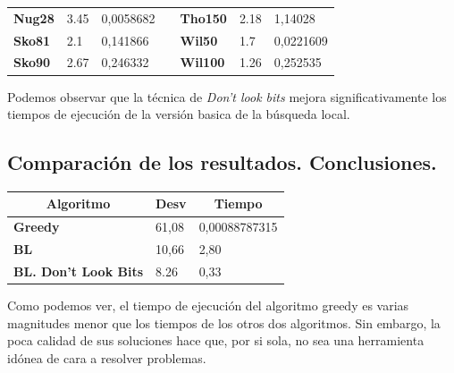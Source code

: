 \documentclass[a4paper, 12pt]{article}
\begin{document}
\begin{table}[H]
\begin{tabular}{|l|l|l|l|l|l|l|}
\textbf{Nug28}   & 3.45                               & 0,0058682                            &  & \textbf{Tho150}  & 2.18                               & 1,14028                              \\ \cline{1-3} \cline{5-7} 
\textbf{Sko81}   & 2.1                                & 0,141866                             &  & \textbf{Wil50}   & 1.7                                & 0,0221609                            \\ \cline{1-3} \cline{5-7} 
\textbf{Sko90}   & 2.67                               & 0,246332                             &  & \textbf{Wil100}  & 1.26                               & 0,252535                             \\ \cline{1-3} \cline{5-7} 
\end{tabular}
\end{table}

      Podemos observar que la técnica de \textit{Don't look bits} mejora significativamente los tiempos de ejecución de la versión basica de la búsqueda local. 
      
      
      
      
      
      \newpage
      \subsection*{Comparación de los resultados. Conclusiones.}
\begin{table}[H]
\centering
\label{my-label}
\begin{tabular}{|l|l|l|}
\hline
\multicolumn{1}{|c|}{\textbf{Algoritmo}} & \textbf{Desv} & \multicolumn{1}{c|}{\textbf{Tiempo}} \\ \hline
\textbf{Greedy}                          & 61,08         & 0,00088787315                        \\ \hline
\textbf{BL}                              & 10,66         & 2,80                                 \\ \hline
\textbf{BL. Don't Look Bits}             & 8.26          & 0,33                                 \\ \hline
\end{tabular}
\end{table}
      
      Como podemos ver, el tiempo de ejecución del algoritmo greedy es varias magnitudes menor que los tiempos de los otros dos algoritmos. Sin embargo, la poca calidad de sus soluciones hace que, por si sola, no sea una herramienta idónea de cara a resolver problemas.\\
      
\end{document}
